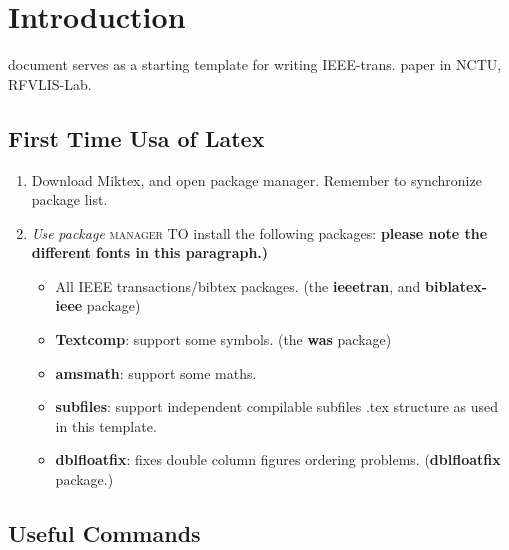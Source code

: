 \documentclass[rfvlsi_template_jrnl.tex]{subfiles}
\begin{document}
\section{Introduction}
% 
% 
% 
% 


 document serves as a starting template for writing IEEE-trans. paper in NCTU, RFVLIS-Lab.

\subsection{First Time Usa of Latex}

\begin{enumerate}
  \item Download Miktex, and open package manager. Remember to synchronize package list. 
  \item \textit{Use} \emph{package} \textsc{manager} \uppercase{to} install the following packages: \textbf{please note the different fonts in this paragraph.)}
	\begin{itemize}
		\item All IEEE transactions/bibtex packages. (the \textbf{ieeetran}, and \textbf{biblatex-ieee} package)
		\item \textbf{Textcomp}: support some symbols. (the \textbf{was} package)
		\item \textbf{amsmath}: support some maths. 
		\item \textbf{subfiles}: support independent compilable subfiles .tex structure as used in this template. 
		\item \textbf{dblfloatfix}: fixes double column figures ordering problems. (\textbf{dblfloatfix} package.)
	\end{itemize}
\end{enumerate}

\subsection{Useful Commands}
\end{document}
